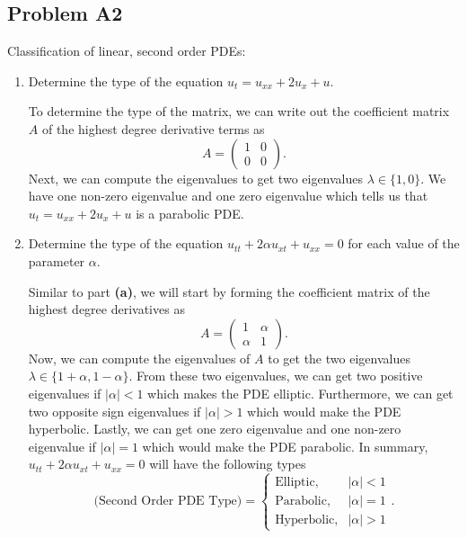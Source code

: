 \documentclass[a4paper,12pt]{article}
\newcommand{\abs}[1]{\left| #1 \right|}
\newcommand{\pmat}[1]{\begin{pmatrix} #1 \end{pmatrix}}
\begin{document}
\subsection*{Problem A2}
    Classification of linear, second order PDEs:
     \begin{enumerate}[label = \textbf{(\alph*)}]
            \item Determine the type of the equation $ u_t = u_{xx} + 2 u_x + u $.
            
            To determine the type of the matrix, we can write out the coefficient matrix $ A $ of the highest degree derivative terms as 
            \[
                A =
                \pmat{
                    1 & 0 \\
                    0 & 0
                }.
            \]
            Next, we can compute the eigenvalues to get two eigenvalues $ \lambda \in \{1, 0\} $. We have one non-zero eigenvalue and one zero eigenvalue which tells us that $ u_t = u_{xx} + 2 u_x + u $ is a parabolic PDE.
            
            \item Determine the type of the equation $ u_{tt} + 2 \alpha u_{xt} + u_{xx} = 0 $ for each value of the parameter $ \alpha $.
            
            Similar to part \textbf{(a)}, we will start by forming the coefficient matrix of the highest degree derivatives as
            \[
                A =
                \pmat{
                    1 & \alpha \\
                    \alpha & 1
                }.
            \]
            Now, we can compute the eigenvalues of $ A $ to get the two eigenvalues $ \lambda \in \{1 + \alpha, 1 - \alpha\} $. From these two eigenvalues, we can get two positive eigenvalues if $ \abs{\alpha} < 1 $ which makes the PDE elliptic. Furthermore, we can get two opposite sign eigenvalues if $ \abs{\alpha} > 1 $ which would make the PDE hyperbolic. Lastly, we can get one zero eigenvalue and one non-zero eigenvalue if $ \abs{\alpha} = 1 $ which would make the PDE parabolic. In summary, $ u_{tt} + 2 \alpha u_{xt} + u_{xx} = 0 $ will have the following types
            \[
                \text{(Second Order PDE Type)} =
                \begin{cases}
                    \text{Elliptic}, & \abs{\alpha} < 1 \\
                    \text{Parabolic}, & \abs{\alpha} = 1 \\
                    \text{Hyperbolic}, & \abs{\alpha} > 1
                \end{cases}.
           \] 
            

\end{enumerate}
\end{document}
